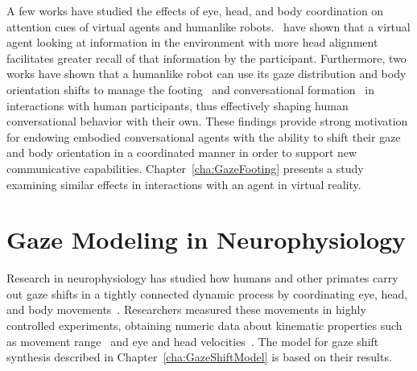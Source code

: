A few works have studied the effects of eye, head, and body coordination on attention cues of virtual agents and humanlike robots.~\citet{andrist2012designing} have shown that a virtual agent looking at information in the environment with more head alignment facilitates greater recall of that information by the participant. Furthermore, two works have shown that a humanlike robot can use its gaze distribution and body orientation shifts to manage the footing~\citep{mutlu2012conversational} and conversational formation~\citep{kuzuoka2010reconfiguring} in interactions with human participants, thus effectively shaping human conversational behavior with their own. These findings provide strong motivation for endowing embodied conversational agents with the ability to shift their gaze and body orientation in a coordinated manner in order to support new communicative capabilities. Chapter~\ref{cha:GazeFooting} presents a study examining similar effects in interactions with an agent in virtual reality.

\section{Gaze Modeling in Neurophysiology}

Research in neurophysiology has studied how humans and other primates carry out gaze shifts in a tightly connected dynamic process by coordinating eye, head, and body movements~\citep{zangemeister1982types,andredeshays1988eyehead1,barnes1979vor,freedman2000coordination,uemura1980eyehead,mccluskey2007monkeys}. Researchers measured these movements in highly controlled experiments, obtaining numeric data about kinematic properties such as movement range~\citep{guitton1987gaze} and eye and head velocities~\citep{guitton1987gaze,freedman2000coordination,barnes1979vor,uemura1980eyehead}. The model for gaze shift synthesis described in Chapter~\ref{cha:GazeShiftModel} is based on their results.

